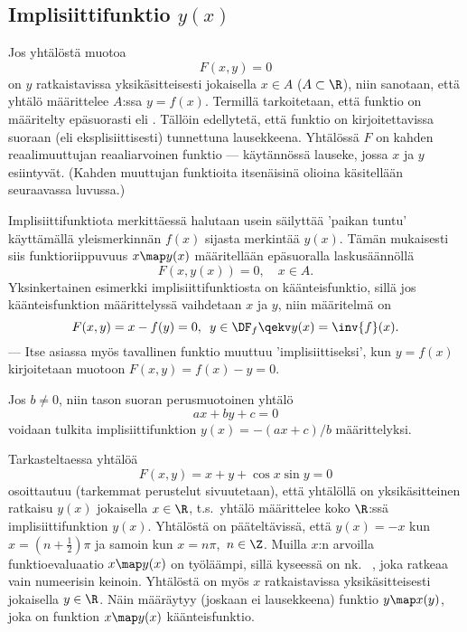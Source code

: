 \subsection{Implisiittifunktio $y(x)$}

Jos yhtälöstä muotoa
\[
F(x,y)=0
\]
on $y$ ratkaistavissa yksikäsitteisesti jokaisella $x \in A$ ($A\subset\R$), niin
sanotaan, että yhtälö määrittelee $A$:ssa  $y=f(x)$. Termillä
tarkoitetaan, että funktio on määritelty epäsuorasti eli . Tällöin
 edellytetä, että funktio on kirjoitettavissa suoraan (eli eksplisiittisesti)
tunnettuna lausekkeena. Yhtälössä $F$ on kahden reaalimuuttujan reaaliarvoinen funktio --- 
käytännössä lauseke, jossa $x$ ja $y$ esiintyvät. (Kahden muuttujan funktioita itsenäisinä
olioina käsitellään seuraavassa luvussa.)

Implisiittifunktiota merkittäessä halutaan usein säilyttää 'paikan tuntu' käyttämällä
yleismerkinnän $f(x)$ sijasta merkintää $y(x)$. Tämän mukaisesti siis funktioriippuvuus
$x \map y(x)$ määritellään epäsuoralla laskusäännöllä
\[
F(x,y(x))=0, \quad x \in A.
\]
Yksinkertainen esimerkki implisiittifunktiosta on käänteisfunktio, sillä jos
käänteisfunktion määrittelyssä vaihdetaan $x$ ja $y$, niin määritelmä on
\[
F(x,y)=x-f(y)=0,\,\ y\in\DF_f \qekv y(x)=\inv{f}(x).
\]
--- Itse asiassa myös tavallinen funktio muuttuu 'implisiittiseksi', kun $y=f(x)$ 
kirjoitetaan muotoon $F(x,y)=f(x)-y=0$.
\begin{Exa} Jos $b \neq 0$, niin tason suoran perusmuotoinen yhtälö
\[
ax+by+c=0
\]
voidaan tulkita implisiittifunktion $y(x)=-(ax+c)/b$ määrittelyksi. \loppu
\end{Exa} 
\begin{Exa} \label{muuan implisiittifunktio} Tarkasteltaessa yhtälöä
\[
F(x,y)=x+y+\cos x\sin y=0
\]
osoittautuu (tarkemmat perustelut sivuutetaan), että yhtälöllä on yksikäsitteinen ratkaisu
$y(x)$ jokaisella $x\in\R$, t.s.\ yhtälö määrittelee koko $\R$:ssä implisiittifunktion $y(x)$.
Yhtälöstä on pääteltävissä, että $y(x)=-x$ kun $x=(n+\tfrac{1}{2})\pi$ ja samoin kun
$x=n\pi$, $\,n\in\Z$. Muilla $x$:n arvoilla funktioevaluaatio $x \map y(x)$ on työläämpi, sillä
kyseessä on nk.\ 
%
, joka ratkeaa vain numeerisin keinoin.
Yhtälöstä on myös $x$ ratkaistavissa yksikäsitteisesti jokaisella $y\in\R$. Näin määräytyy
(joskaan ei lausekkeena) funktio $y \map x(y)$, joka on funktion $x \map y(x)$ käänteisfunktio.
\loppu \end{Exa}

